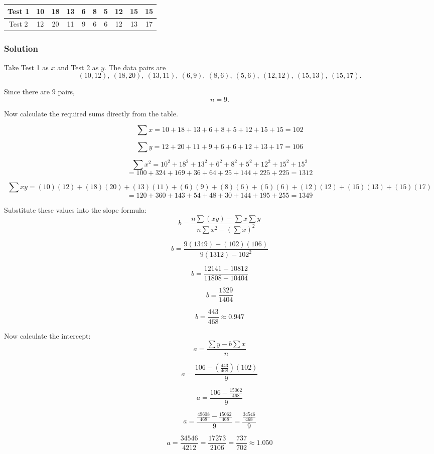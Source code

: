 \documentclass[12pt]{article}
\begin{document}
	\begin{center}
		\small
		\setlength{\tabcolsep}{6pt}
		\begin{tabular}{|c|c|c|c|c|c|c|c|c|c|}
			\hline
			Test 1 & 10 & 18 & 13 & 6 & 8 & 5 & 12 & 15 & 15 \\ \hline
			Test 2 & 12 & 20 & 11 & 9 & 6 & 6 & 12 & 13 & 17 \\ \hline
		\end{tabular}
	\end{center}
	
	\subsubsection*{Solution}
	
	Take Test 1 as \(x\) and Test 2 as \(y\). The data pairs are
	\[
	(10,12),\ (18,20),\ (13,11),\ (6,9),\ (8,6),\ (5,6),\ (12,12),\ (15,13),\ (15,17).
	\]
	
	Since there are \(9\) pairs,
	\[
	n=9.
	\]
	
	Now calculate the required sums directly from the table.
	
	\[
	\sum x = 10+18+13+6+8+5+12+15+15 = 102
	\]
	
	\[
	\sum y = 12+20+11+9+6+6+12+13+17 = 106
	\]
	
	\[
	\sum x^2 = 10^2+18^2+13^2+6^2+8^2+5^2+12^2+15^2+15^2
	\]
	\[
	=100+324+169+36+64+25+144+225+225 = 1312
	\]
	
	\[
	\sum xy = (10)(12)+(18)(20)+(13)(11)+(6)(9)+(8)(6)+(5)(6)+(12)(12)+(15)(13)+(15)(17)
	\]
	\[
	=120+360+143+54+48+30+144+195+255 = 1349
	\]
	
	Substitute these values into the slope formula:
	\[
	b=\frac{n\sum(xy)-\sum x\sum y}{n\sum x^2-(\sum x)^2}
	\]
	
	\[
	b=\frac{9(1349)-(102)(106)}{9(1312)-102^2}
	\]
	
	\[
	b=\frac{12141-10812}{11808-10404}
	\]
	
	\[
	b=\frac{1329}{1404}
	\]
	
	\[
	b=\frac{443}{468}\approx 0.947
	\]
	
	Now calculate the intercept:
	\[
	a=\frac{\sum y-b\sum x}{n}
	\]
	
	\[
	a=\frac{106-\left(\frac{443}{468}\right)(102)}{9}
	\]
	
	\[
	a=\frac{106-\frac{15062}{468}}{9}
	\]
	
	\[
	a=\frac{\frac{49608}{468}-\frac{15062}{468}}{9}
	=\frac{\frac{34546}{468}}{9}
	\]
	
	\[
	a=\frac{34546}{4212}
	=\frac{17273}{2106}
	=\frac{737}{702}
	\approx 1.050
	\]
	
\end{document}
